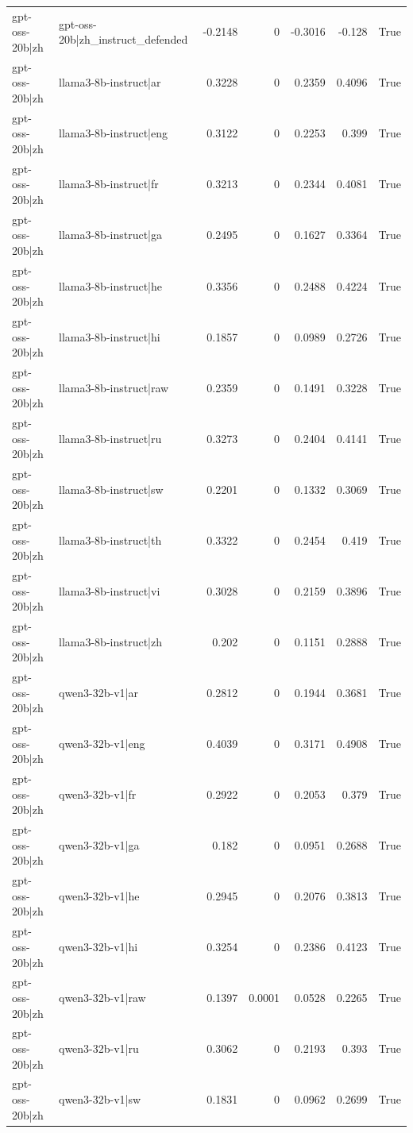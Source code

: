 \begin{table}
\begin{tabular}{l l r r r r l}
gpt-oss-20b|zh & gpt-oss-20b|zh_instruct_defended & -0.2148 & 0 & -0.3016 & -0.128 & True \\
gpt-oss-20b|zh & llama3-8b-instruct|ar & 0.3228 & 0 & 0.2359 & 0.4096 & True \\
gpt-oss-20b|zh & llama3-8b-instruct|eng & 0.3122 & 0 & 0.2253 & 0.399 & True \\
gpt-oss-20b|zh & llama3-8b-instruct|fr & 0.3213 & 0 & 0.2344 & 0.4081 & True \\
gpt-oss-20b|zh & llama3-8b-instruct|ga & 0.2495 & 0 & 0.1627 & 0.3364 & True \\
gpt-oss-20b|zh & llama3-8b-instruct|he & 0.3356 & 0 & 0.2488 & 0.4224 & True \\
gpt-oss-20b|zh & llama3-8b-instruct|hi & 0.1857 & 0 & 0.0989 & 0.2726 & True \\
gpt-oss-20b|zh & llama3-8b-instruct|raw & 0.2359 & 0 & 0.1491 & 0.3228 & True \\
gpt-oss-20b|zh & llama3-8b-instruct|ru & 0.3273 & 0 & 0.2404 & 0.4141 & True \\
gpt-oss-20b|zh & llama3-8b-instruct|sw & 0.2201 & 0 & 0.1332 & 0.3069 & True \\
gpt-oss-20b|zh & llama3-8b-instruct|th & 0.3322 & 0 & 0.2454 & 0.419 & True \\
gpt-oss-20b|zh & llama3-8b-instruct|vi & 0.3028 & 0 & 0.2159 & 0.3896 & True \\
gpt-oss-20b|zh & llama3-8b-instruct|zh & 0.202 & 0 & 0.1151 & 0.2888 & True \\
gpt-oss-20b|zh & qwen3-32b-v1|ar & 0.2812 & 0 & 0.1944 & 0.3681 & True \\
gpt-oss-20b|zh & qwen3-32b-v1|eng & 0.4039 & 0 & 0.3171 & 0.4908 & True \\
gpt-oss-20b|zh & qwen3-32b-v1|fr & 0.2922 & 0 & 0.2053 & 0.379 & True \\
gpt-oss-20b|zh & qwen3-32b-v1|ga & 0.182 & 0 & 0.0951 & 0.2688 & True \\
gpt-oss-20b|zh & qwen3-32b-v1|he & 0.2945 & 0 & 0.2076 & 0.3813 & True \\
gpt-oss-20b|zh & qwen3-32b-v1|hi & 0.3254 & 0 & 0.2386 & 0.4123 & True \\
gpt-oss-20b|zh & qwen3-32b-v1|raw & 0.1397 & 0.0001 & 0.0528 & 0.2265 & True \\
gpt-oss-20b|zh & qwen3-32b-v1|ru & 0.3062 & 0 & 0.2193 & 0.393 & True \\
gpt-oss-20b|zh & qwen3-32b-v1|sw & 0.1831 & 0 & 0.0962 & 0.2699 & True \\

\end{tabular}
\end{table}
